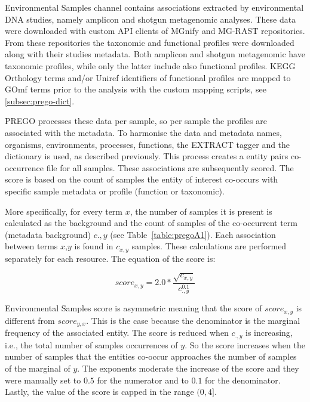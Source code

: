Environmental Samples channel contains associations extracted by environmental DNA studies, 
namely amplicon and shotgun metagenomic analyses. These data were downloaded with custom API clients
of MGnify \parencite{mitchell2020mgnify} and MG-RAST \parencite{wilke2015restful} repositories.
From these repositories the taxonomic and functional profiles were downloaded along with their 
studies metadata. Both amplicon and shotgun metagenomic have taxonomic profiles, while 
only the latter include also functional profiles.
KEGG Orthology terms and/or Uniref identifiers of functional profiles are mapped to GOmf terms 
prior to the analysis with the custom mapping scripts, see \ref{subsec:prego-dict}.

PREGO processes these data per sample, so per sample the profiles are associated with the metadata. 
To harmonise the data and metadata names, organisms, environments, processes, functions, the EXTRACT tagger and the dictionary is used, as described previously. 
This process creates a entity pairs co-occurrence file for all samples. 
These associations are subsequently scored. The score is based on the count of
samples the entity of interest co-occurs with specific sample metadata or profile (function or taxonomic). 

More specifically, for every term $x$, the number of samples it is present is calculated as the background 
and the count of samples of the co-occurrent term (metadata background) $c.,y$ (see Table~\ref{table:pregoA1}). 
Each association between terms $x$,$y$ is found in $c_{x,y}$ samples. 
These calculations are performed separately for each resource.
The equation of the score is:

\begin{equation}
   score_{x,y} = 2.0*{\frac{\sqrt{c_{x,y}}}{c_{.,y}^{0.1}}}
\end{equation}

Environmental Samples score is asymmetric meaning that the score of $score_{x,y}$ is different from $score_{y,x}$.
This is the case because the denominator is the marginal frequency of the associated entity. 
The score is reduced when $c_{.,y}$ is increasing, i.e., the total number of samples occurrences of $y$. 
So the score increases when the number of samples that the entities co-occur 
approaches the number of samples of the marginal of $y$.
The exponents moderate the increase of the score and they were 
manually set to $0.5$ for the numerator and 
to $0.1$ for the denominator.
Lastly, the value of the score is capped in the range $(0,4]$.

